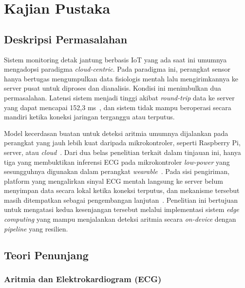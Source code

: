 \chapter{Kajian Pustaka}

\section{Deskripsi Permasalahan}

Sistem monitoring detak jantung berbasis IoT yang ada saat ini umumnya mengadopsi paradigma \textit{cloud-centric}. Pada paradigma ini, perangkat sensor hanya bertugas mengumpulkan data fisiologis mentah lalu mengirimkannya ke server pusat untuk diproses dan dianalisis. Kondisi ini menimbulkan dua permasalahan. Latensi sistem menjadi tinggi akibat \textit{round-trip} data ke server yang dapat mencapai 152,3 ms~\cite{al_quayed_2026}, dan sistem tidak mampu beroperasi secara mandiri ketika koneksi jaringan terganggu atau terputus.

Model kecerdasan buatan untuk deteksi aritmia umumnya dijalankan pada perangkat yang jauh lebih kuat daripada mikrokontroler, seperti Raspberry Pi, server, atau \textit{cloud}~\cite{karri_2023, mekhfioui_2025, xie_2021, mulyawan_2026}. Dari dua belas penelitian terkait dalam tinjauan ini, hanya tiga yang membuktikan inferensi ECG pada mikrokontroler \textit{low-power} yang sesungguhnya digunakan dalam perangkat \textit{wearable}~\cite{kim_2023, zambrano_2026, sheeba_rani_2026}. Pada sisi pengiriman, platform yang mengalirkan sinyal ECG mentah langsung ke server belum menyimpan data secara lokal ketika koneksi terputus, dan mekanisme tersebut masih ditempatkan sebagai pengembangan lanjutan~\cite{escobedo_2026}. Penelitian ini bertujuan untuk mengatasi kedua kesenjangan tersebut melalui implementasi sistem \textit{edge computing} yang mampu menjalankan deteksi aritmia secara \textit{on-device} dengan \textit{pipeline} yang resilien.

\section{Teori Penunjang}

\subsection{Aritmia dan Elektrokardiogram (ECG)}

